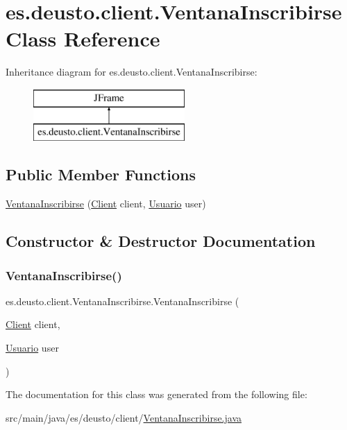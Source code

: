 \hypertarget{classes_1_1deusto_1_1client_1_1_ventana_inscribirse}{}\section{es.\+deusto.\+client.\+Ventana\+Inscribirse Class Reference}
\label{classes_1_1deusto_1_1client_1_1_ventana_inscribirse}
Inheritance diagram for es.\+deusto.\+client.\+Ventana\+Inscribirse\+:\begin{figure}[H]
\begin{center}
\leavevmode
\includegraphics[height=2.000000cm]{classes_1_1deusto_1_1client_1_1_ventana_inscribirse}
\end{center}
\end{figure}
\subsection*{Public Member Functions}
\begin{DoxyCompactItemize}
\item 
\mbox{\hyperlink{classes_1_1deusto_1_1client_1_1_ventana_inscribirse_a6a94a08764b1382b4f5b3545c92e0ad8}{Ventana\+Inscribirse}} (\mbox{\hyperlink{classes_1_1deusto_1_1client_1_1_client}{Client}} client, \mbox{\hyperlink{classes_1_1deusto_1_1server_1_1jdo_1_1_usuario}{Usuario}} user)
\end{DoxyCompactItemize}


\subsection{Constructor \& Destructor Documentation}
\mbox{\label{classes_1_1deusto_1_1client_1_1_ventana_inscribirse_a6a94a08764b1382b4f5b3545c92e0ad8}} 
\subsubsection{\texorpdfstring{VentanaInscribirse()}{VentanaInscribirse()}}
{\footnotesize\ttfamily es.\+deusto.\+client.\+Ventana\+Inscribirse.\+Ventana\+Inscribirse (\begin{DoxyParamCaption}\item[{\mbox{\hyperlink{classes_1_1deusto_1_1client_1_1_client}{Client}}}]{client,  }\item[{\mbox{\hyperlink{classes_1_1deusto_1_1server_1_1jdo_1_1_usuario}{Usuario}}}]{user }\end{DoxyParamCaption})}



The documentation for this class was generated from the following file\+:\begin{DoxyCompactItemize}
\item 
src/main/java/es/deusto/client/\mbox{\hyperlink{_ventana_inscribirse_8java}{Ventana\+Inscribirse.\+java}}\end{DoxyCompactItemize}
